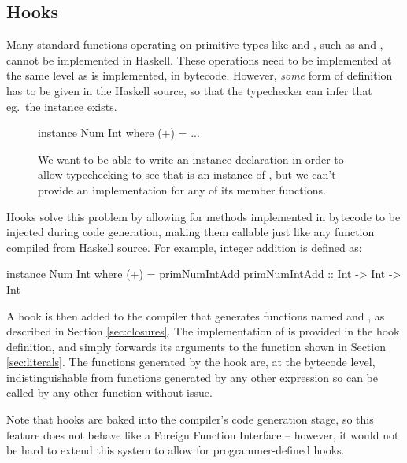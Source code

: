 \documentclass[dissertation.tex]{subfiles}
\begin{document}
{    \subsection{Hooks}\label{sec:hooks}
    {
        Many standard functions operating on primitive types like  and , such as \haskell{(+)} and \haskell{(==)}, cannot be implemented in Haskell. These operations need to be implemented at the same level as  is implemented, in bytecode. However, \textit{some} form of definition has to be given in the Haskell source, so that the typechecker can infer that eg.\ the instance exists.

        \begin{figure}[h]
        \begin{haskellfigure}
        instance Num Int where
            (+) = ...
        \end{haskellfigure}
        \caption{We want to be able to write an instance declaration in order to allow typechecking to see that  is an instance of , but we can't provide an implementation for any of its member functions.}
        \end{figure}

        Hooks solve this problem by allowing for methods implemented in bytecode to be injected during code generation, making them callable just like any function compiled from Haskell source. For example, integer addition is defined as:

        \begin{haskellfigure}
        instance Num Int where
            (+) = primNumIntAdd
        primNumIntAdd :: Int -> Int -> Int
        \end{haskellfigure}

        A hook is then added to the compiler that generates functions named  and , as described in Section \ref{sec:closures}. The implementation of  is provided in the hook definition, and simply forwards its arguments to the  function shown in Section \ref{sec:literals}. The functions generated by the hook are, at the bytecode level, indistinguishable from functions generated by any other expression so can be called by any other function without issue.

        Note that hooks are baked into the compiler's code generation stage, so this feature does not behave like a Foreign Function Interface -- however, it would not be hard to extend this system to allow for programmer-defined hooks.
    }
}
\end{document}
